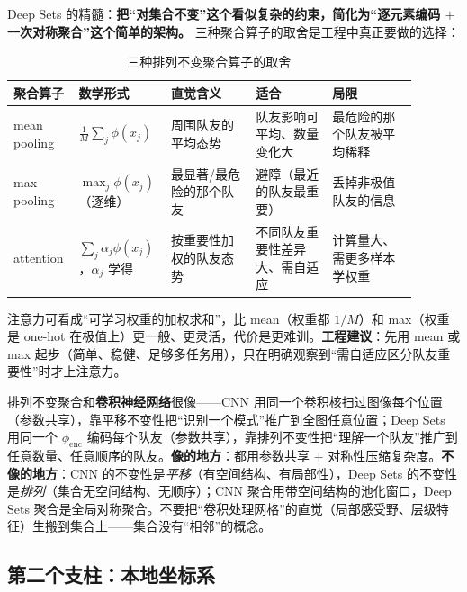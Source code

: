 \noindent Deep Sets 的精髓：\textbf{把“对集合不变”这个看似复杂的约束，简化为“逐元素编码 $+$ 一次对称聚合”这个简单的架构。} 三种聚合算子的取舍是工程中真正要做的选择：

\begin{table}[H]\centering\small
\caption{三种排列不变聚合算子的取舍}
\label{tab:mc-agg}
\begin{tabular}{p{0.13\linewidth}p{0.18\linewidth}p{0.20\linewidth}p{0.18\linewidth}p{0.20\linewidth}}
\toprule
聚合算子 & 数学形式 & 直觉含义 & 适合 & 局限 \\
\midrule
mean pooling & $\frac1M\sum_j\phi(x_j)$ & 周围队友的平均态势 & 队友影响可平均、数量变化大 & 最危险的那个队友被平均稀释 \\
max pooling & $\max_j\phi(x_j)$（逐维） & 最显著/最危险的那个队友 & 避障（最近的队友最重要） & 丢掉非极值队友的信息 \\
attention & $\sum_j\alpha_j\phi(x_j)$，$\alpha_j$ 学得 & 按重要性加权的队友态势 & 不同队友重要性差异大、需自适应 & 计算量大、需更多样本学权重 \\
\bottomrule
\end{tabular}
\end{table}

\noindent 注意力可看成“可学习权重的加权求和”，比 mean（权重都 $1/M$）和 max（权重是 one-hot 在极值上）更一般、更灵活，代价是更难训。\textbf{工程建议}：先用 mean 或 max 起步（简单、稳健、足够多任务用），只在明确观察到“需自适应区分队友重要性”时才上注意力。

\begin{insight}
排列不变聚合和\textbf{卷积神经网络}很像——CNN 用同一个卷积核扫过图像每个位置（参数共享），靠平移不变性把“识别一个模式”推广到全图任意位置；Deep Sets 用同一个 $\phi_{\mathrm{enc}}$ 编码每个队友（参数共享），靠排列不变性把“理解一个队友”推广到任意数量、任意顺序的队友。\textbf{像的地方}：都用参数共享 $+$ 对称性压缩复杂度。\textbf{不像的地方}：CNN 的不变性是\emph{平移}（有空间结构、有局部性），Deep Sets 的不变性是\emph{排列}（集合无空间结构、无顺序）；CNN 聚合用带空间结构的池化窗口，Deep Sets 聚合是全局对称聚合。不要把“卷积处理网格”的直觉（局部感受野、层级特征）生搬到集合上——集合没有“相邻”的概念。
\end{insight}

\subsection{第二个支柱：本地坐标系}
\label{sec:mc-egocentric}

